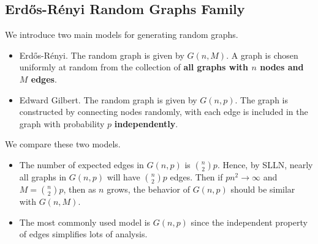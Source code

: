 \subsection{Erdős-Rényi Random Graphs Family}
We introduce two main models for generating random graphs.
\begin{itemize}
	\item Erdős-Rényi. The random graph is given by \(G(n, M)\). A graph is chosen uniformly at random from the collection of \textbf{all graphs with \(n\) nodes and \(M\) edges}.
	\item Edward Gilbert. The random graph is given by \(G(n, p)\). The graph is constructed by connecting nodes randomly, with each edge is included in the graph with probability \(p\) \textbf{independently}.
\end{itemize}

\begin{remark}
	We compare these two models.
	\begin{itemize}
		\item The number of expected edges in \(G(n, p)\) is \(\binom{n}{2}p\). Hence, by SLLN, nearly all graphs in \(G(n, p)\) will have \(\binom{n}{2}p\) edges. Then if
		      \(pn^{2} \to \infty \) and \(M = \binom{n}{2}p\), then as \(n\) grows, the behavior of \(G(n, p)\) should be similar with \(G(n, M)\).
		\item The most commonly used model is \(G(n, p)\) since the independent property of edges simplifies lots of analysis.
	\end{itemize}
\end{remark}

\hr

